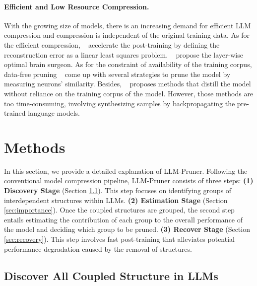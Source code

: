 \documentclass{article}
\begin{document}
\paragraph{Efficient and Low Resource Compression.} With the growing size of models, there is an increasing demand for efficient LLM compression and compression is independent of the original training data. As for the efficient compression, ~\cite{kwon2022fast} accelerate the post-training by defining the reconstruction error as a linear least squares problem. ~\cite{frantar2022gptq,frantar2023massive} propose the layer-wise optimal brain surgeon. As for the constraint of availability of the training corpus, data-free pruning ~\cite{srinivas2015data,yvinec2022red++} come up with several strategies to prune the model by measuring neurons' similarity. Besides, ~\cite{maprompting,ma2020adversarial,rashid2020zeroshot} proposes methods that distill the model without reliance on the training corpus of the model. However, those methods are too time-consuming, involving synthesizing samples by backpropagating the pre-trained language models.


\section{Methods}
In this section, we provide a detailed explanation of LLM-Pruner. Following the conventional model compression pipeline\cite{kwon2022fast}, LLM-Pruner consists of  three steps:
\textbf{(1) Discovery Stage} (Section \ref{sec:dependency}). This step focuses on identifying groups of interdependent structures within LLMs. 
\textbf{(2) Estimation Stage} (Section \ref{sec:importance}). Once the coupled structures are grouped, the second step entails estimating the contribution of each group to the overall performance of the model and deciding which group to be pruned.
\textbf{(3) Recover Stage} (Section \ref{sec:recovery}). This step involves fast post-training that alleviates potential performance degradation caused by the removal of structures.  

\subsection{Discover All Coupled Structure in LLMs} \label{sec:dependency}
\end{document}
